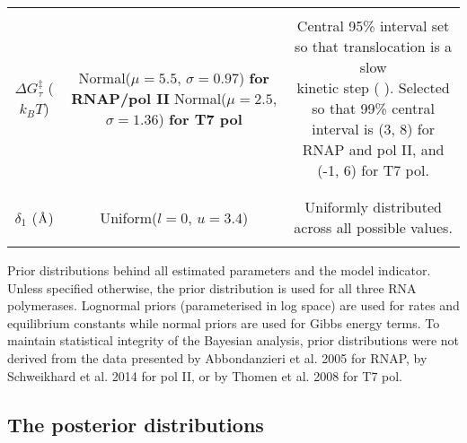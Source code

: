 \documentclass[10pt,letterpaper]{article}
\newcommand{\angstrom}{\mbox{\normalfont\AA}}
\begin{document}
\begin{table}[!htb]
\begin{adjustwidth}{-2.25in}{0in}
{\begin{tabular}{|ccc|}
&&\\
\hline
&&\\

$\Delta G^\ddag_{\tau}$ ($k_B T$) & \makecell{ Normal($\mu = 5.5$, $\sigma = 0.97$) \textbf{for RNAP/pol II} \\ Normal($\mu = 2.5$, $\sigma = 1.36$) \textbf{for T7 pol} } & \makecell{ Central 95\% interval set so that translocation is a slow \\ kinetic step (\nameref{S4_Appendix} ). Selected so that 99\% central \\ interval is (3, 8) for RNAP and pol II, and (-1, 6) for T7 pol.}  \\

&&\\
\hline
&&\\



$\delta_1$ ($\angstrom$) & Uniform($l = 0$, $u = 3.4$) & Uniformly distributed across all possible values. \\

&&\\
\hline



\end{tabular}

}


\label{S2_Table}

\begin{flushleft} Prior distributions behind all estimated parameters and the model indicator. Unless specified otherwise, the prior distribution is used for all three RNA polymerases. Lognormal priors (parameterised in log space) are used for rates and equilibrium constants while normal priors are used for Gibbs energy terms. To maintain statistical integrity of the Bayesian analysis, prior distributions were not derived from the data presented by Abbondanzieri et al. 2005 \cite{abbondanzieri2005direct} for RNAP, by Schweikhard et al. 2014 \cite{schweikhard2014transcription} for pol II, or by Thomen et al. 2008 \cite{thomen2008t7} for T7 pol.
\end{flushleft}
\label{table2}
\end{adjustwidth}
\end{table}









\subsection*{The posterior distributions}
\end{document}
